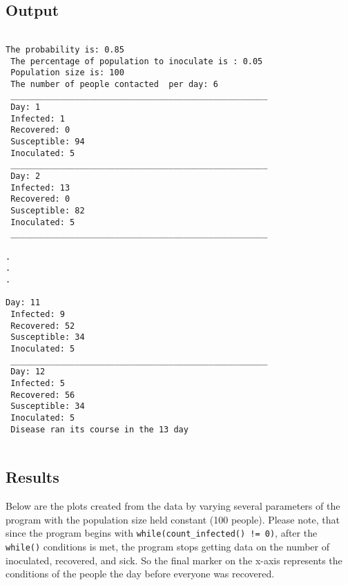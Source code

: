 \documentclass[paper=a4, fontsize=11pt]{scrartcl}
\begin{document}
\subsection{Output}
\begin{verbatim}

The probability is: 0.85
 The percentage of population to inoculate is : 0.05
 Population size is: 100
 The number of people contacted  per day: 6
 ____________________________________________________ 
 Day: 1
 Infected: 1
 Recovered: 0
 Susceptible: 94
 Inoculated: 5
 ____________________________________________________ 
 Day: 2
 Infected: 13
 Recovered: 0
 Susceptible: 82
 Inoculated: 5
 ____________________________________________________ 

.
.
.

Day: 11
 Infected: 9
 Recovered: 52
 Susceptible: 34
 Inoculated: 5
 ____________________________________________________ 
 Day: 12
 Infected: 5
 Recovered: 56
 Susceptible: 34
 Inoculated: 5
 Disease ran its course in the 13 day 
 
\end{verbatim}


\subsection{Results}

Below are the plots created from the data by varying several parameters of the program with the population size held constant (100 people). Please note, that since the program begins with \texttt{while(count\_infected() != 0)}, after the \texttt{while()} conditions is met, the program stops getting data on the number of inoculated, recovered, and sick. So the final marker on the x-axis represents the conditions of the people the day before everyone was recovered.\\
\end{document}
